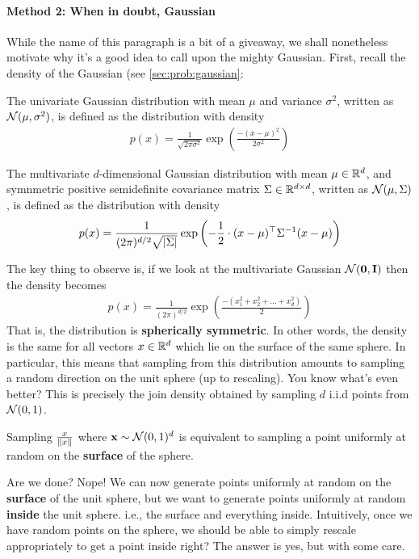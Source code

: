     \paragraph{Method 2: When in doubt, Gaussian}
    While the name of this paragraph is a bit of a giveaway, we shall nonetheless motivate why it's a good idea to call upon the mighty Gaussian. First, recall the density of the Gaussian (see \autoref{sec:prob:gaussian}:
    \begin{defn}
    The univariate Gaussian distribution with mean $\mu$ and variance $\sigma^2$, written as $\mathcal{N}(\mu, \sigma^2)$, is defined as the distribution with density
    \begin{align*}
        p(x) = \frac{1}{\sqrt{2\pi \sigma^2}} \exp\left(\frac{-(x-\mu)^2}{2\sigma^2}\right)
    \end{align*}
    \end{defn}
    
    \begin{defn}
    The multivariate $d$-dimensional Gaussian distribution with mean $\mu \in \mathbb{R}^d$, and symnmetric positive semidefinite covariance matrix $\Sigma \in \mathbb{R}^{d \times d}$, written as $\mathcal{N}(\mu, \Sigma)$, is defined as the distribution with density
    \begin{align*}
        p(x) = \frac{1}{(2\pi)^{d/2} \sqrt{|\Sigma|}} \exp\left(-\frac{1}{2} \cdot (x - \mu)^\top \Sigma^{-1} (x - \mu) \right)
    \end{align*}
    \end{defn}
    The key thing to observe is, if we look at the multivariate Gaussian $\mathcal{N}(\mathbf{0}, \mathbf{I})$ then the density becomes
    \begin{align*}
        p(x) = \frac{1}{(2\pi)^{d/2}} \exp\left(\frac{-(x_1^2 + x_2^2 + \dots + x_d^2)}{2}\right)
    \end{align*}
    That is, the distribution is {\bf spherically symmetric}. In other words, the density is the same for all vectors $x \in \mathbb{R}^d$ which lie on the surface of the same sphere. In particular, this means that sampling from this distribution amounts to sampling a random direction on the unit sphere (up to rescaling). You know what's even better? This is precisely the join density obtained by sampling $d$ i.i.d points from $\mathcal{N}(0,1)$.
    \begin{theorem}
    Sampling $\frac{x}{\lVert x \rVert}$ where $\mathbf{x} \sim \mathcal{N}(0,1)^d$ is equivalent to sampling a point uniformly at random on the \textbf{surface} of the sphere.
    \end{theorem}
    Are we done? Nope! We can now generate points uniformly at random on the \textbf{surface} of the unit sphere, but we want to generate points uniformly at random \textbf{inside} the unit sphere. i.e., the surface and everything inside. Intuitively, once we have random points on the sphere, we should be able to simply rescale appropriately to get a point inside right? The answer is yes, but with some care.
    

